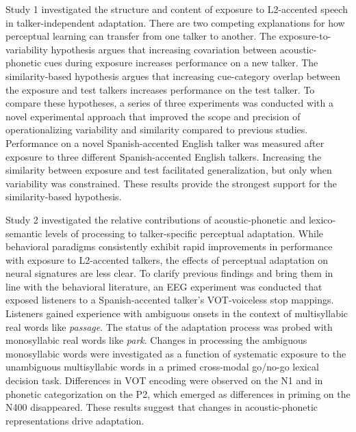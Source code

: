 \documentclass[
  12pt,
  twoside]{article}
\begin{document}
Study 1 investigated the structure and content of exposure to L2-accented speech in talker-independent adaptation.
There are two competing explanations for how perceptual learning can transfer from one talker to another.
The exposure-to-variability hypothesis argues that increasing covariation between acoustic-phonetic cues during exposure increases performance on a new talker.
The similarity-based hypothesis argues that increasing cue-category overlap between the exposure and test talkers increases performance on the test talker.
To compare these hypotheses, a series of three experiments was conducted with a novel experimental approach that improved the scope and precision of operationalizing variability and similarity compared to previous studies.
Performance on a novel Spanish-accented English talker was measured after exposure to three different Spanish-accented English talkers.
Increasing the similarity between exposure and test facilitated generalization, but only when variability was constrained.
These results provide the strongest support for the similarity-based hypothesis.

Study 2 investigated the relative contributions of acoustic-phonetic and lexico-semantic levels of processing to talker-specific perceptual adaptation.
While behavioral paradigms consistently exhibit rapid improvements in performance with exposure to L2-accented talkers, the effects of perceptual adaptation on neural signatures are less clear.
To clarify previous findings and bring them in line with the behavioral literature, an EEG experiment was conducted that exposed listeners to a Spanish-accented talker's VOT-voiceless stop mappings.
Listeners gained experience with ambiguous onsets in the context of multisyllabic real words like \emph{passage}.
The status of the adaptation process was probed with monosyllabic real words like \emph{park}.
Changes in processing the ambiguous monosyllabic words were investigated as a function of systematic exposure to the unambiguous multisyllabic words in a primed cross-modal go/no-go lexical decision task.
Differences in VOT encoding were observed on the N1 and in phonetic categorization on the P2, which emerged as differences in priming on the N400 disappeared.
These results suggest that changes in acoustic-phonetic representations drive adaptation.

\renewcommand{\contentsname}{Table of contents}

\newpage
\setcounter{tocdepth}{3}
\tableofcontents

\clearpage
{}
{}
\listoffigures
\end{document}
